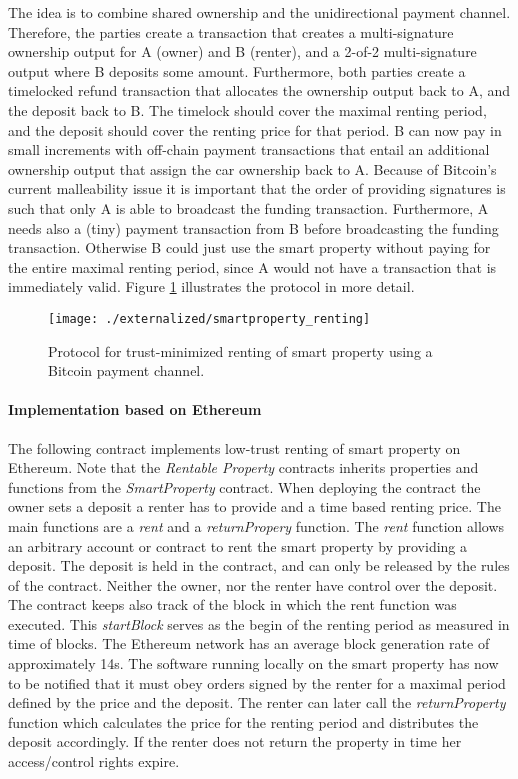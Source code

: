 The idea is to combine shared ownership and the unidirectional payment channel. Therefore, the parties create a transaction that creates a multi-signature ownership output for A (owner) and B (renter), and a 2-of-2 multi-signature output where B deposits some amount. Furthermore, both parties create a timelocked refund transaction that allocates the ownership output back to A, and the deposit back to B. The timelock should cover the maximal renting period, and the deposit should cover the renting price for that period. B can now pay in small increments with off-chain payment transactions that entail an additional ownership output that assign the car ownership back to A. Because of Bitcoin's current malleability issue it is important that the order of providing signatures is such that only A is able to broadcast the funding transaction. Furthermore, A needs also a (tiny) payment transaction from B before broadcasting the funding transaction. Otherwise B could just use the smart property without paying for the entire maximal renting period, since A would not have a transaction that is immediately valid. Figure \ref{fig:smartproperty_renting} illustrates the protocol in more detail.

\begin{figure}[!t]
    \centering
    \texttt{[image: ./externalized/smartproperty\_renting]}
    \caption{Protocol for trust-minimized renting of smart property using a Bitcoin payment channel.}
    \label{fig:smartproperty_renting}
  \end{figure}

\paragraph{Implementation based on Ethereum}


The following contract implements low-trust renting of smart property on Ethereum. Note that the \emph{Rentable Property} contracts inherits properties and functions from the \emph{SmartProperty} contract. When deploying the contract the owner sets a deposit a renter has to provide and a time based renting price. The main functions are a \emph{rent} and a \emph{returnPropery} function. The \emph{rent} function allows an arbitrary account or contract to rent the smart property by providing a deposit. The deposit is held in the contract, and can only be released by the rules of the contract. Neither the owner, nor the renter have control over the deposit. The contract keeps also track of the block in which the rent function was executed. This \emph{startBlock} serves as the begin of the renting period as measured in time of blocks. The Ethereum network has an average block generation rate of approximately 14s. 
The software running locally on the smart property has now to be notified that it must obey orders signed by the renter for a maximal period defined by the price and the deposit. 
The renter can later call the \emph{returnProperty} function which calculates the price for the renting period and distributes the deposit accordingly. If the renter does not return the property in time her access/control rights expire. 

